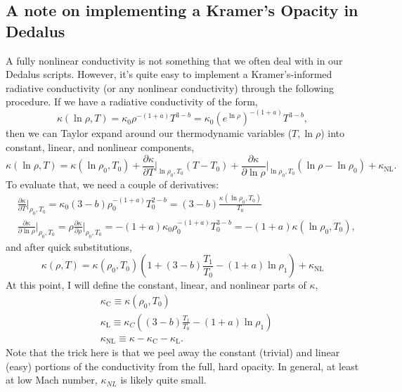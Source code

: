 \subsection{A note on implementing a Kramer's Opacity in Dedalus}
A fully nonlinear conductivity is not something that we often deal with in our Dedalus scripts.
However, it's quite easy to implement a Kramer's-informed radiative conductivity (or any nonlinear conductivity) through the following procedure.
If we have a radiative conductivity of the form,
\begin{equation}
\kappa(\ln\rho, T) = \kappa_0 \rho^{-(1 + a)} T^{3 - b}
= \kappa_0 \left(e^{\ln\rho}\right)^{-(1 + a)} T^{3 - b},
\end{equation}
then we can Taylor expand around our thermodynamic variables ($T, \ln\rho$) into constant, linear, and nonlinear components,
\begin{equation}
\kappa(\ln\rho, T) = \kappa(\ln\rho_0, T_0) 
+ \frac{\partial \kappa}{\partial T}\bigg|_{\ln\rho_0, T_0}(T - T_0)
+ \frac{\partial \kappa}{\partial \ln\rho}\bigg|_{\ln\rho_0, T_0}(\ln\rho - \ln\rho_0)
+ \kappa_{\text{NL}}.
\end{equation}
To evaluate that, we need a couple of derivatives:
\begin{equation}
\begin{split}
&\frac{\partial \kappa}{\partial T}\bigg|_{\rho_0, T_0} = 
\kappa_0(3-b)\rho_0^{-(1+a)}T_0^{2-b} = (3-b)\frac{\kappa(\ln\rho_0, T_0)}{T_0} \\
&\frac{\partial \kappa}{\partial \ln\rho}\bigg|_{\rho_0, T_0} =
\rho\frac{\partial \kappa}{\partial \rho}\bigg|_{\rho_0, T_0} =
-(1+a)\kappa_0 \rho_0^{-(1+a)} T_0^{3-b} = -(1+a)\kappa(\ln\rho_0, T_0),
\end{split}
\end{equation}
and after quick substitutions,
\begin{equation}
\kappa(\rho, T) = \kappa(\rho_0, T_0)\left( 1 +
(3 - b)\frac{T_1}{T_0} - (1 + a) \ln\rho_1 \right)
+ \kappa_{\text{NL}}
\end{equation}
At this point, I will define the constant, linear, and nonlinear parts of $\kappa$,
\begin{equation}
\begin{split}
&\kappa_\text{C} \equiv \kappa(\rho_0, T_0) \\
&\kappa_\text{L} \equiv \kappa_C\left(
(3 - b)\frac{T_1}{T_0} - (1 + a) \ln\rho_1 \right) \\
&\kappa_{\text{NL}} \equiv \kappa - \kappa_\text{C} - \kappa_{\text{L}}.
\end{split}
\end{equation}
Note that the trick here is that we peel away the constant (trivial) and linear (easy) portions of the conductivity from the full, hard opacity.
In general, at least at low Mach number, $\kappa_{NL}$ is likely quite small.

